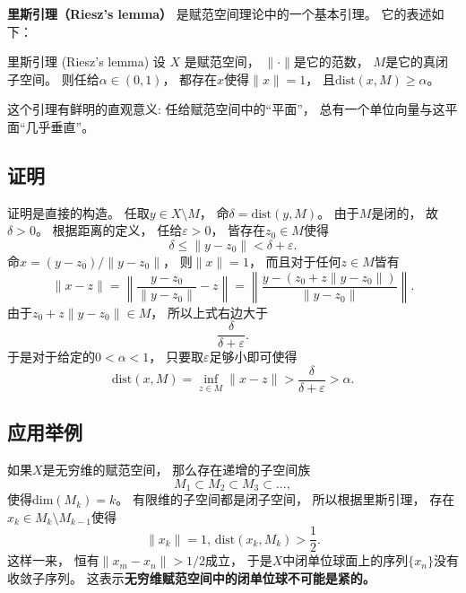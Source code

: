 
\begin{issues}
\issueNeedCite
\end{issues}


\textbf{里斯引理（Riesz's lemma）} 是赋范空间理论中的一个基本引理。 它的表述如下：

\begin{lemma}{里斯引理 (Riesz's lemma)}
设 $X$ 是赋范空间， $\|\cdot\|$是它的范数， $M$是它的真闭子空间。 则任给$\alpha\in(0,1)$， 都存在$x$使得$\|x\|=1$， 且$\text{dist}(x,M)\geq\alpha$。
\end{lemma}

这个引理有鲜明的直观意义: 任给赋范空间中的“平面”， 总有一个单位向量与这平面“几乎垂直”。

\subsection{证明}
证明是直接的构造。 任取$y\in X\setminus M$， 命$\delta=\text{dist}(y,M)$。 由于$M$是闭的， 故$\delta>0$。 根据距离的定义， 任给$\varepsilon>0$， 皆存在$z_0\in M$使得
$$
\delta\leq \|y-z_0\|<\delta+\varepsilon.
$$
命$x=(y-z_0)/\|y-z_0\|$， 则$\|x\|=1$， 而且对于任何$z\in M$皆有
$$
\|x-z\|
=\left\|\frac{y-z_0}{\|y-z_0\|}-z\right\|
=\left\|\frac{y-(z_0+z\|y-z_0\|)}{\|y-z_0\|}\right\|.
$$
由于$z_0+z\|y-z_0\|\in M$， 所以上式右边大于
$$
\frac{\delta}{\delta+\varepsilon}.
$$
于是对于给定的$0<\alpha<1$， 只要取$\varepsilon$足够小即可使得
$$
\text{dist}(x,M)
=\inf_{z\in M}\|x-z\|
>\frac{\delta}{\delta+\varepsilon}
>\alpha.
$$

\subsection{应用举例}
如果$X$是无穷维的赋范空间， 那么存在递增的子空间族
$$
M_1\subset M_2\subset M_3\subset...,
$$
使得$\text{dim}(M_k)=k$。 有限维的子空间都是闭子空间， 所以根据里斯引理， 存在$x_k\in M_k\setminus M_{k-1}$使得
$$
\|x_k\|=1,\,\text{dist}(x_k,M_k)>\frac{1}{2}.
$$
这样一来， 恒有$\|x_m-x_n\|>1/2$成立， 于是$X$中闭单位球面上的序列$\{x_n\}$没有收敛子序列。 这表示\textbf{无穷维赋范空间中的闭单位球不可能是紧的。}